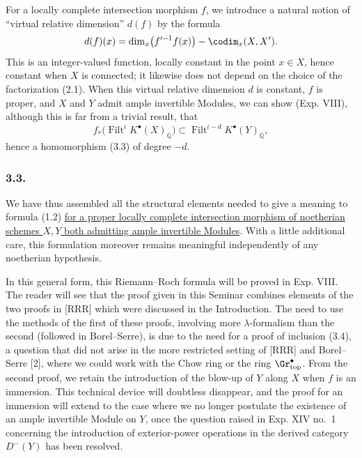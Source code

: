 For a locally complete intersection morphism $f$, we introduce a natural notion of ``virtual relative dimension'' $d(f)$ by the formula
\[
d(f)(x)=\dim_x\bigl(f'^{-1}f(x)\bigr)-\codim_x(X,X').
\]
This is an integer-valued function, locally constant in the point $x\in X$, hence constant when $X$ is connected; it likewise does not depend on the choice of the factorization (2.1). When this virtual relative dimension $d$ is constant, $f$ is proper, and $X$ and $Y$ admit ample invertible Modules, we can show (Exp. VIII), although this is far from a trivial result, that
\begin{equation}\tag{3.4}
f_*\bigl(\operatorname{Filt}^iK^\bullet(X)_{\mathbb Q}\bigr)\subset \operatorname{Filt}^{i-d}K^\bullet(Y)_{\mathbb Q},
\end{equation}
hence a homomorphism (3.3) of degree $-d$.

\subsubsection*{3.3.}
We have thus assembled all the structural elements needed to give a meaning to formula (1.2) \uline{for a proper locally complete intersection morphism of noetherian schemes $X,Y$ both admitting ample invertible Modules}. With a little additional care, this formulation moreover remains meaningful independently of any noetherian hypothesis.

In this general form, this Riemann--Roch formula will be proved in Exp. VIII. The reader will see that the proof given in this Seminar combines elements of the two proofs in [RRR] which were discussed in the Introduction. The need to use the methods of the first of these proofs, involving more $\lambda$-formalism than the second (followed in Borel--Serre), is due to the need for a proof of inclusion (3.4), a question that did not arise in the more restricted setting of [RRR] and Borel--Serre [2], where we could work with the Chow ring or the ring $\Gr^\bullet_{\mathrm{top}}$. From the second proof, we retain the introduction of the blow-up of $Y$ along $X$ when $f$ is an immersion. This technical device will doubtless disappear, and the proof for an immersion will extend to the case where we no longer postulate the existence of an ample invertible Module on $Y$, once the question raised in Exp. XIV no.~1 concerning the introduction of exterior-power operations in the derived category $D^-(Y)$ has been resolved.

